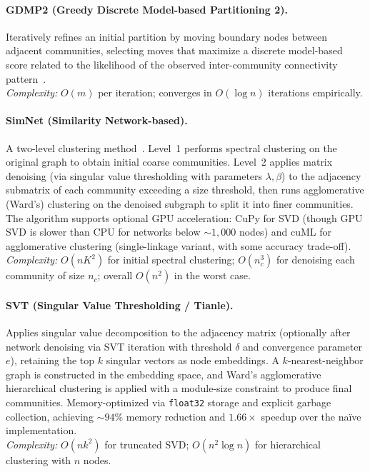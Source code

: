 \documentclass[11pt]{article}
\begin{document}
\paragraph{GDMP2 (Greedy Discrete Model-based Partitioning 2).}
Iteratively refines an initial partition by moving boundary nodes between adjacent communities, selecting moves that maximize a discrete model-based score related to the likelihood of the observed inter-community connectivity pattern~\citep{santo_fortunato_93a74814}.\\
\emph{Complexity:} $O(m)$ per iteration; converges in $O(\log n)$ iterations empirically.

\paragraph{SimNet (Similarity Network-based).}
A two-level clustering method~\citep{choobdar_dream_2019}. Level~1 performs spectral clustering on the original graph to obtain initial coarse communities. Level~2 applies matrix denoising (via singular value thresholding with parameters $\lambda, \beta$) to the adjacency submatrix of each community exceeding a size threshold, then runs agglomerative (Ward's) clustering on the denoised subgraph to split it into finer communities. The algorithm supports optional GPU acceleration: CuPy for SVD (though GPU SVD is slower than CPU for networks below ${\sim}1{,}000$ nodes) and cuML for agglomerative clustering (single-linkage variant, with some accuracy trade-off).\\
\emph{Complexity:} $O(nK^2)$ for initial spectral clustering; $O(n_c^3)$ for denoising each community of size $n_c$; overall $O(n^2)$ in the worst case.

\paragraph{SVT (Singular Value Thresholding / Tianle).}
Applies singular value decomposition to the adjacency matrix (optionally after network denoising via SVT iteration with threshold $\delta$ and convergence parameter $e$), retaining the top $k$ singular vectors as node embeddings. A $k$-nearest-neighbor graph is constructed in the embedding space, and Ward's agglomerative hierarchical clustering is applied with a module-size constraint to produce final communities. Memory-optimized via \texttt{float32} storage and explicit garbage collection, achieving ${\sim}94\%$ memory reduction and $1.66\times$ speedup over the na\"ive implementation.\\
\emph{Complexity:} $O(nk^2)$ for truncated SVD; $O(n^2\log n)$ for hierarchical clustering with $n$ nodes.
\end{document}
